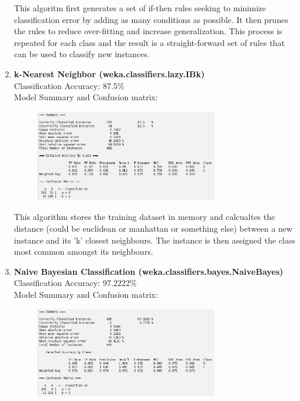 \documentclass{article}
\begin{document}
\begin{enumerate}[label = (\alph*), left=10pt, itemsep=10pt]
\begin{minipage}[t]{0.9\textwidth}
\begin{figure}[H]
            \end{figure}
            This algoritm first generates a set of if-then rules seeking to minimize classification error by adding as many
            conditions as possible. It then prunes the rules to reduce over-fitting and increase generalization. This process
            is repeated for each class and the result is a straight-forward set of rules that can be used to classify new
            instances.
        \end{minipage}
        \item \begin{minipage}[t]{0.9\textwidth}
            \textbf{k-Nearest Neighbor (weka.classifiers.lazy.IBk)}\\
             Classification Accuracy: 87.5\%\\
             Model Summary and Confusion matrix:
             \begin{figure}[H]
                \includegraphics[width=0.75\textwidth, height=0.25\textheight]{./6c2.png}
            \end{figure} 
            This algorithm stores the training dataset in memory and calcualtes the distance
            (could be euclidean or manhattan or something else) between a new instance and its 'k'
            closest neighbours. The instance is then assigned the class most common amongst its neighbours. 
        \end{minipage}
        \item \begin{minipage}[t]{0.9\textwidth}
            \textbf{Naive Bayesian Classification (weka.classifiers.bayes.NaiveBayes)}\\
             Classification Accuracy: 97.2222\%\\
             Model Summary and Confusion matrix:
             \begin{figure}[H]
                \includegraphics[width=0.75\textwidth, height=0.25\textheight]{./6d2.png}

\end{figure}
\end{minipage}
\end{enumerate}
\end{document}

